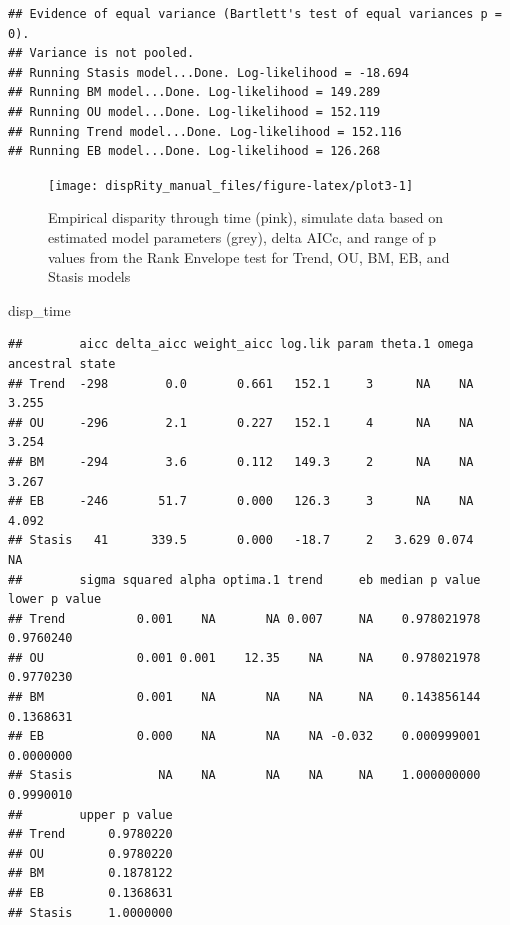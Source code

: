 \documentclass[
]{book}
\newenvironment{Shaded}{\begin{snugshade}}{\end{snugshade}}
\newcommand{\NormalTok}[1]{#1}
\begin{document}
\begin{verbatim}
## Evidence of equal variance (Bartlett's test of equal variances p = 0).
## Variance is not pooled.
## Running Stasis model...Done. Log-likelihood = -18.694
## Running BM model...Done. Log-likelihood = 149.289
## Running OU model...Done. Log-likelihood = 152.119
## Running Trend model...Done. Log-likelihood = 152.116
## Running EB model...Done. Log-likelihood = 126.268
\end{verbatim}

\begin{figure}

{\centering \texttt{[image: dispRity\_manual\_files/figure-latex/plot3-1]} 

}

\caption{Empirical disparity through time (pink), simulate data based on estimated model parameters (grey), delta AICc, and range of p values from the Rank Envelope test for Trend, OU, BM, EB, and Stasis models}\label{fig:plot3}
\end{figure}

\begin{Shaded}
\begin{Highlighting}[]
\NormalTok{disp\_time}
\end{Highlighting}
\end{Shaded}

\begin{verbatim}
##        aicc delta_aicc weight_aicc log.lik param theta.1 omega ancestral state
## Trend  -298        0.0       0.661   152.1     3      NA    NA           3.255
## OU     -296        2.1       0.227   152.1     4      NA    NA           3.254
## BM     -294        3.6       0.112   149.3     2      NA    NA           3.267
## EB     -246       51.7       0.000   126.3     3      NA    NA           4.092
## Stasis   41      339.5       0.000   -18.7     2   3.629 0.074              NA
##        sigma squared alpha optima.1 trend     eb median p value lower p value
## Trend          0.001    NA       NA 0.007     NA    0.978021978     0.9760240
## OU             0.001 0.001    12.35    NA     NA    0.978021978     0.9770230
## BM             0.001    NA       NA    NA     NA    0.143856144     0.1368631
## EB             0.000    NA       NA    NA -0.032    0.000999001     0.0000000
## Stasis            NA    NA       NA    NA     NA    1.000000000     0.9990010
##        upper p value
## Trend      0.9780220
## OU         0.9780220
## BM         0.1878122
## EB         0.1368631
## Stasis     1.0000000
\end{verbatim}
\end{document}
